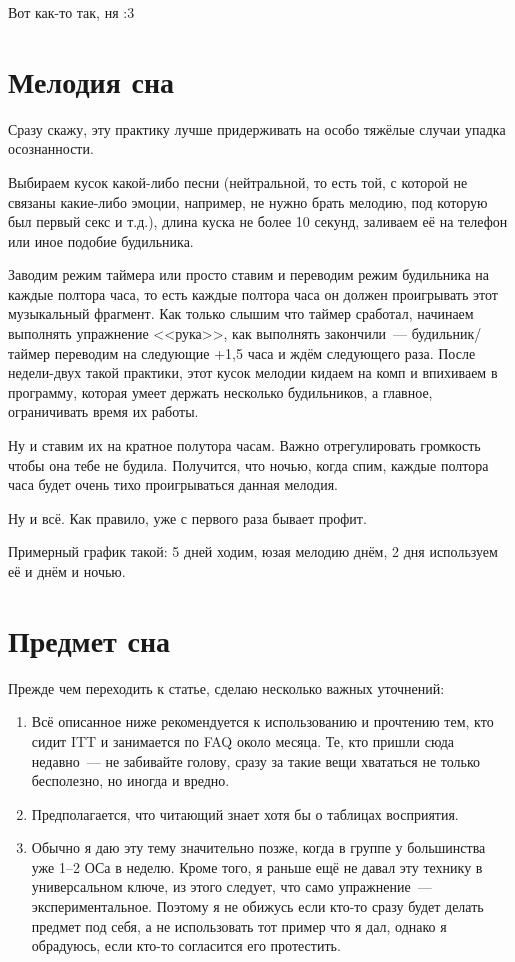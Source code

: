 \documentclass[a5paper,12pt,twoside]{memoir}
\begin{document}
Вот как-то так, ня :3



\chapter{Мелодия сна} 
Сразу скажу, эту практику лучше придерживать на особо тяжёлые случаи упадка осознанности. 

Выбираем кусок какой-либо песни (нейтральной, то есть той, с которой не связаны какие-либо эмоции, например, не нужно брать мелодию, под которую был первый секс и т.д.), длина куска не более 10 секунд, заливаем её на телефон или иное подобие будильника.
 
Заводим режим таймера или просто ставим и переводим режим будильника на каждые полтора часа, то есть каждые полтора часа он должен проигрывать этот музыкальный фрагмент. Как только слышим что таймер сработал, начинаем выполнять упражнение <<рука>>, как выполнять закончили~--- будильник/таймер переводим на следующие +1,5 часа и ждём следующего раза. После недели-двух такой практики, этот кусок мелодии кидаем на комп и впихиваем в программу, которая умеет держать несколько будильников, а главное, ограничивать время их работы. 

Ну и ставим их на кратное полутора часам. Важно отрегулировать громкость чтобы она тебе не будила. Получится, что ночью, когда спим, каждые полтора часа будет очень тихо проигрываться данная мелодия. 

Ну и всё. Как правило, уже с первого раза бывает профит.
 
Примерный график такой: 5 дней ходим, юзая мелодию днём, 2 дня используем её и днём и ночью. 



\chapter{Предмет сна}
Прежде чем переходить к статье, сделаю несколько важных уточнений:
\begin{enumerate}
\item Всё описанное ниже рекомендуется к использованию и прочтению тем, кто сидит ITT и занимается по FAQ около месяца. Те, кто пришли сюда недавно~--- не забивайте голову, сразу за такие вещи хвататься не только бесполезно, но иногда и вредно. 
\item Предполагается, что читающий знает хотя бы о таблицах восприятия.
\item Обычно я даю эту тему значительно позже, когда в группе у большинства уже 1--2 ОСа в неделю. Кроме того, я раньше ещё не давал эту технику в универсальном ключе, из этого следует, что само упражнение~--- экспериментальное. Поэтому я не обижусь если кто-то сразу будет делать предмет под себя, а не использовать тот пример что я дал, однако я обрадуюсь, если кто-то согласится его протестить.
\end{enumerate}
\smallskip
\end{document}
